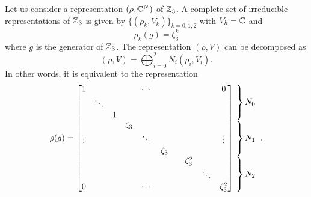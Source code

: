             Let us consider a representation $(\rho,\mathbb{C}^N)$ of $\mathbb{Z}_3$. A complete set of irreducible representations of $\mathbb{Z}_3$ is given by $\{(\rho_k,V_k)\}_{k=0,1,2}$ with $V_k=\mathbb{C}$ and
            \begin{equation}
                \rho_k(g)=\zeta^k_3
            \end{equation}
            where $g$ is the generator of $\mathbb{Z}_3$. The representation $(\rho,V)$ can be decomposed as
            \begin{equation}
                (\rho,V)=\bigoplus^{2}_{i=0}N_i(\rho_i,V_i).
            \end{equation}
            In other words, it is equivalent to the representation
            \begin{equation}
                \rho(g)=
                \begin{bmatrix}
                    1 & & & & \cdots & & & & & 0 \\
                    & \ddots & & & & & & & & \\
                    & & 1 & & & & & & & \\
                    & & & \zeta_3 & & & & & & \\
                    \vdots & & & & \ddots & & & & & \vdots \\
                    & & & & & \zeta_3 & & & & \\
                    & & & & & & & \zeta^2_3 & & \\
                    & & & & & & & & \ddots & \\
                    0 & & & & \cdots & & & & & \zeta^2_3 \\
                \end{bmatrix}
                \hspace{-0.2cm}
                \begin{tabular}{l}
                $\left.\lefteqn{\phantom{
                    \begin{matrix}
                        a_0\\ \ddots\\ a_0\ 
                    \end{matrix} 
                }}\right\}N_0$\\
                $\left.\lefteqn{\phantom{
                    \begin{matrix}
                        a_0\\ \ddots\\ a_0\ 
                    \end{matrix} 
                }}\right\}N_1$\\
                $\left.\lefteqn{\phantom{
                    \begin{matrix}
                        b_0\\ \ddots\\ b_0\ 
                    \end{matrix}
                }} \right\}N_2$
                \end{tabular}.\label{eq:reprrhoZn}
            \end{equation}
